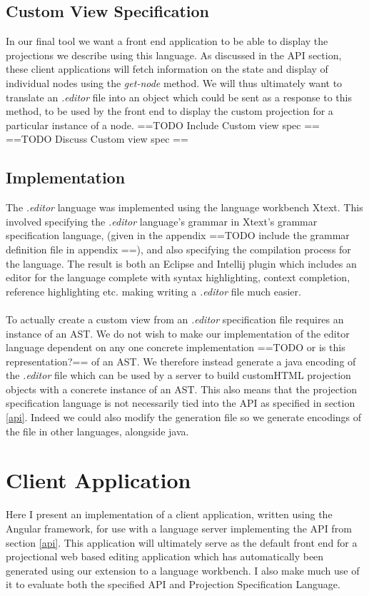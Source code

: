 \documentclass{article}
\begin{document}
\subsection{Custom View Specification}
In our final tool we want a front end application to be able to display the projections we describe using this language. As discussed in the API section, these client applications will fetch information on the state and display of individual nodes using the \emph{get-node} method. We will thus ultimately want to translate an \emph{.editor} file into an object which could be sent as a response to this method, to be used by the front end to display the custom projection for a particular instance of a node.
==TODO Include Custom view spec ==
==TODO Discuss Custom view spec == 


\subsection{Implementation}
The \emph{.editor} language was implemented using the language workbench Xtext. This involved specifying the \emph{.editor} language's grammar in Xtext's grammar specification language, (given in the appendix ==TODO include the grammar definition file in appendix ==), and also specifying the compilation process for the language. The result is both an Eclipse and Intellij plugin which includes an editor for the language complete with syntax highlighting, context completion, reference highlighting etc. making writing a \emph{.editor} file much easier.
\\
\\
To actually create a custom view from an \emph{.editor} specification file requires an instance of an AST. We do not wish to make our implementation of the editor language dependent on any one concrete implementation ==TODO or is this representation?== of an AST. We therefore instead generate a java encoding of the \emph{.editor} file which can be used by a server to build customHTML projection objects with a concrete instance of an AST. This also means that the projection specification language is not necessarily tied into the API as specified in section \ref{api}. Indeed we could also modify the generation file so we generate encodings of the file in other languages, alongside java.

\section{Client Application}
Here I present an implementation of a client application, written using the Angular framework, for use with a language server implementing the API from section \ref{api}. This application will ultimately serve as the default front end for a projectional web based editing application which has automatically been generated using our extension to a language workbench. I also make much use of it to evaluate both the specified API and Projection Specification Language. 
\end{document}
